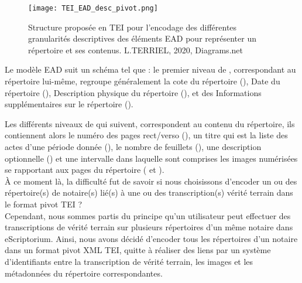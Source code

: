 \newpage
\begin{figure}[h!]
  \begin{sideways}
    \texttt{[image: TEI\_EAD\_desc\_pivot.png]}
  \end{sideways}
  \centering
  \caption{Structure proposée en TEI pour l'encodage des différentes granularités descriptives des éléments EAD  pour représenter un répertoire et ses contenus. \textcopyright L.TERRIEL, 2020, Diagrams.net}
  \label{fig:TEI_EAD_desc_pivot}
\end{figure}
\clearpage

Le modèle EAD suit un schéma tel que : le premier niveau de , correspondant au répertoire lui-même, regroupe généralement la cote du répertoire (), Date du répertoire (), Description physique du répertoire (), et des Informations supplémentaires sur le répertoire (). 

Les différents niveaux de  qui suivent, correspondent au contenu du répertoire, ils contiennent alors le numéro des pages rect/verso (), un titre qui est la liste des actes d'une période donnée (), le nombre de feuillets (), une description optionnelle () et une intervalle dans laquelle sont comprises les images numérisées se rapportant aux pages du répertoire ( et ).\\

À ce moment là, la difficulté fut de savoir si nous choisissons d'encoder un ou des répertoire(s) de notaire(s) lié(s) à une ou des transcription(s) vérité terrain dans le format pivot TEI ?\\

Cependant, nous sommes partis du principe qu'un utilisateur peut effectuer des transcriptions de vérité terrain sur plusieurs répertoires d'un même notaire dans eScriptorium. Ainsi, nous avons décidé d'encoder tous les répertoires d'un notaire dans un format pivot XML TEI, quitte à réaliser des liens par un système d'identifiants entre la transcription de vérité terrain, les images et les métadonnées du répertoire correspondantes.\\

